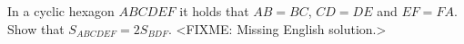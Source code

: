 \problem
In a cyclic hexagon $ABCDEF$ it holds that $AB = BC$, $CD = DE$ and $EF = FA$.
Show that $S_{ABCDEF} = 2 S_{BDF}$.
\solution
<FIXME: Missing English solution.>
\endproblem
